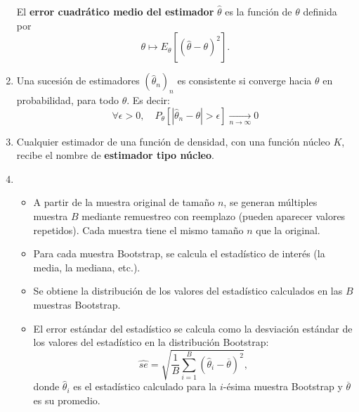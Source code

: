 \begin{enumerate}[label=\color{red}\textbf{\arabic*)}]
    El \textbf{error cuadrático medio del estimador} $\hat{\theta}$ es la función de $\theta$ definida por  \[
      \theta\longmapsto E_{\theta}[(\hat{\theta}-\theta)^2].
    \]  
  \item {}

    Una sucesión de estimadores $(\hat{\theta}_n)_n$ es consistente si converge hacia $\theta$ en probabilidad, para todo  $\theta$. Es decir:  \[
      \forall \epsilon>0,\quad P_{\theta}\left[ |\hat{\theta}_n-\theta|>\epsilon \right] \xrightarrow[n\to \infty]{}0
    \] 
  \item {}

    Cualquier estimador de una función de densidad, con una función núcleo $K$, recibe el nombre de  \textbf{estimador tipo núcleo}. 
  \item {}

    \begin{itemize}[label=\textbullet]
      \item A partir de la muestra original de tamaño $n$, se generan múltiples muestra $B$ mediante remuestreo con reemplazo (pueden aparecer valores repetidos). Cada muestra tiene el mismo tamaño  $n$ que la original.
      \item Para cada muestra Bootstrap, se calcula el estadístico de interés (la media, la mediana, etc.).
      \item Se obtiene la distribución de los valores del estadístico calculados en las $B$ muestras Bootstrap.
      \item El error estándar del estadístico se calcula como la desviación estándar de los valores del estadístico en la distribución Bootstrap:  \[
      \hat{se}=\sqrt{\dfrac{1}{B}\sum_{i=1}^{B}(\hat{\theta}_i-\overline{\theta})^2 }, 
      \] donde $\hat{\theta}_i$ es el estadístico calculado para la $i$-ésima muestra Bootstrap y  $\overline{\theta}$ es su promedio.
    \end{itemize}
\end{enumerate}
